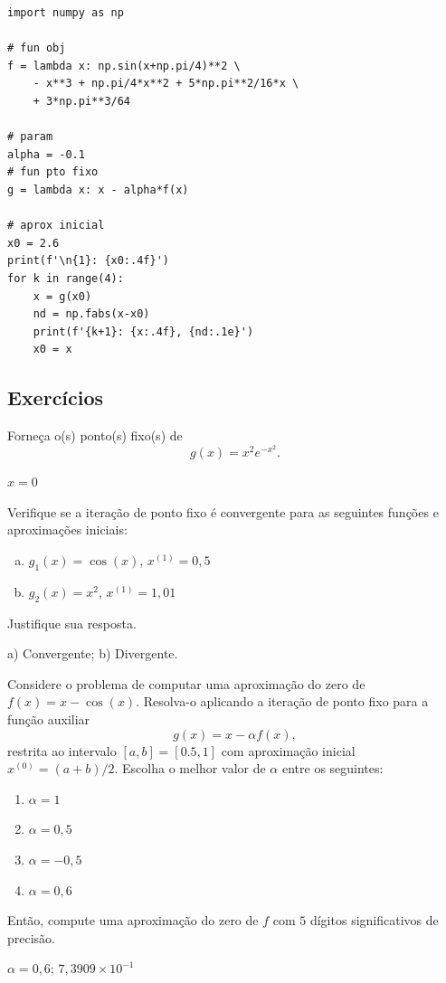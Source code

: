 \begin{ex}
\begin{lstlisting}
import numpy as np

# fun obj
f = lambda x: np.sin(x+np.pi/4)**2 \
    - x**3 + np.pi/4*x**2 + 5*np.pi**2/16*x \
    + 3*np.pi**3/64

# param
alpha = -0.1
# fun pto fixo
g = lambda x: x - alpha*f(x)

# aprox inicial
x0 = 2.6
print(f'\n{1}: {x0:.4f}')
for k in range(4):
    x = g(x0)
    nd = np.fabs(x-x0)
    print(f'{k+1}: {x:.4f}, {nd:.1e}')
    x0 = x
\end{lstlisting}
\end{ex}

\subsection{Exercícios}

\begin{exer}
  Forneça o(s) ponto(s) fixo(s) de
  \begin{equation}
    g(x) = x^2e^{-x^2}.
  \end{equation}
\end{exer}
\begin{resp}
  $x=0$
\end{resp}

\begin{exer}
  Verifique se a iteração de ponto fixo é convergente para as seguintes funções e aproximações iniciais:
  \begin{enumerate}[a)]
  \item $g_1(x) = \cos(x)$, $x^{(1)} = 0,5$
  \item $g_2(x) = x^2$, $x^{(1)} = 1,01$
  \end{enumerate}
  Justifique sua resposta.
\end{exer}
\begin{resp}
  a) Convergente; b) Divergente.
\end{resp}

\begin{exer}
  Considere o problema de computar uma aproximação do zero de $f(x)=x-\cos(x)$. Resolva-o aplicando a iteração de ponto fixo para a função auxiliar
  \begin{equation}
    g(x) = x - \alpha f(x),
  \end{equation}
restrita ao intervalo $[a, b] = [0.5, 1]$ com aproximação inicial $x^{(0)}=(a+b)/2$. Escolha o melhor valor de $\alpha$ entre os seguintes:
\begin{enumerate}
\item $\alpha = 1$
\item $\alpha = 0,5$
\item $\alpha = -0,5$
\item $\alpha = 0,6$
\end{enumerate}
Então, compute uma aproximação do zero de $f$ com $5$ dígitos significativos de precisão.
\end{exer}
\begin{resp}
  $\alpha=0,6$; $7,3909\times 10^{-1}$
\end{resp}

